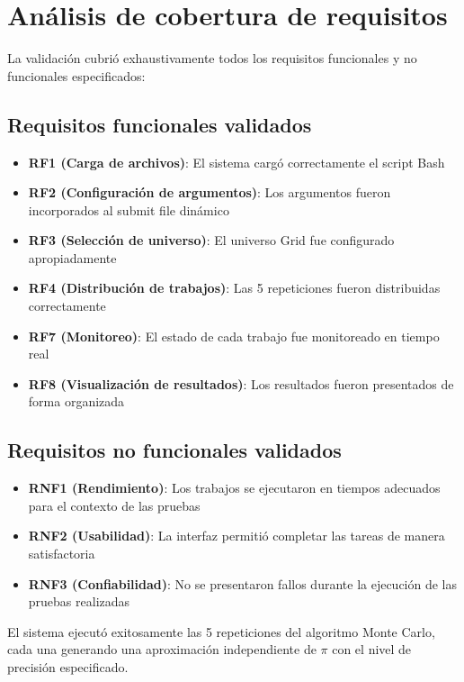 \section{Análisis de cobertura de requisitos}
\noindent

La validación cubrió exhaustivamente todos los requisitos funcionales y no funcionales especificados:

\subsection{Requisitos funcionales validados}
\noindent

\begin{itemize}
	\item \textbf{RF1 (Carga de archivos)}: El sistema cargó correctamente el script Bash
	\item \textbf{RF2 (Configuración de argumentos)}: Los argumentos fueron incorporados al submit file dinámico
	\item \textbf{RF3 (Selección de universo)}: El universo Grid fue configurado apropiadamente
	\item \textbf{RF4 (Distribución de trabajos)}: Las 5 repeticiones fueron distribuidas correctamente
	\item \textbf{RF7 (Monitoreo)}: El estado de cada trabajo fue monitoreado en tiempo real
	\item \textbf{RF8 (Visualización de resultados)}: Los resultados fueron presentados de forma organizada
\end{itemize}

\subsection{Requisitos no funcionales validados}
\noindent

\begin{itemize}
	\item \textbf{RNF1 (Rendimiento)}: Los trabajos se ejecutaron en tiempos adecuados para el contexto de las pruebas
	\item \textbf{RNF2 (Usabilidad)}: La interfaz permitió completar las tareas de manera satisfactoria
	\item \textbf{RNF3 (Confiabilidad)}: No se presentaron fallos durante la ejecución de las pruebas realizadas
\end{itemize}

El sistema ejecutó exitosamente las 5 repeticiones del algoritmo Monte Carlo, cada una generando una aproximación independiente de $\pi$ con el nivel de precisión especificado.


